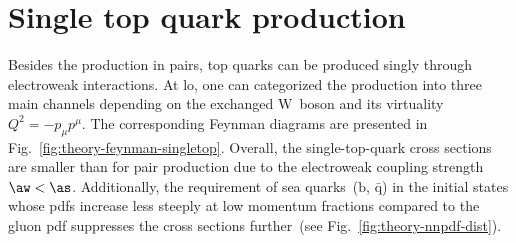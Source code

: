 \section{Single top quark production}
\label{sec:theory-single-top-production}

Besides the production in pairs, top quarks can be produced singly through electroweak interactions. At \gls{lo}, one can categorized the production into three main channels depending on the exchanged $\mathrm{W}$~boson and its virtuality $Q^{2}=-p_{\mu}p^{\mu}$. The corresponding Feynman diagrams are presented in Fig.~\ref{fig:theory-feynman-singletop}. Overall, the single-top-quark cross sections are smaller than for pair production due to the electroweak coupling strength $\aw<\as$. Additionally, the requirement of sea quarks~($\mathrm{b}$, $\bar{\mathrm{q}}$) in the initial states whose \glspl{pdf} increase less steeply at low momentum fractions compared to the gluon \gls{pdf} suppresses the cross sections further~(see Fig.~\ref{fig:theory-nnpdf-dist}).

